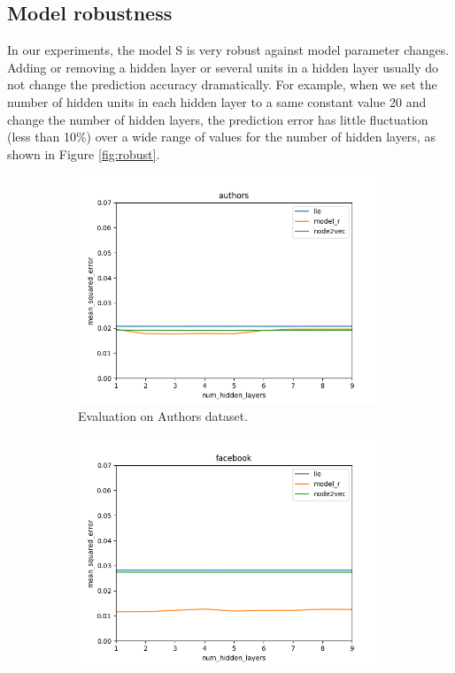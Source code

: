 \documentclass{article} %
\begin{document}
\subsection{Model robustness}
In our experiments, the model S is very robust against model parameter changes. Adding or removing a hidden layer or several units in a hidden layer usually do not change the prediction accuracy dramatically.
For example, when we set the number of hidden units in each hidden layer to a same constant value 20 and change the number of hidden layers,
the prediction error has little fluctuation (less than 10\%) over a wide range of values for the number of hidden layers,
as shown in Figure \ref{fig:robust}.
\begin{figure}[h] \centering
	\begin{subfigure}{0.49 \linewidth}
		\includegraphics[width=\linewidth]{authors}
		\caption{Evaluation on Authors dataset.}
		\label{fig:movieLens100K}
	\end{subfigure}
	\begin{subfigure}{0.49 \linewidth}
		\includegraphics[width=\linewidth]{facebook}

\end{subfigure}
\end{figure}
\end{document}
